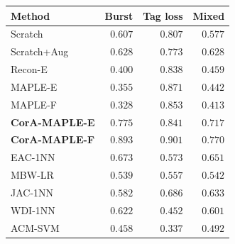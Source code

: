 \begin{tabular}{@{}lrrr@{}}
\toprule
Method & Burst & Tag loss & Mixed \\
\midrule
Scratch & $0.607$ & $0.807$ & $0.577$ \\
Scratch+Aug & $0.628$ & $0.773$ & $0.628$ \\
Recon-E & $0.400$ & $0.838$ & $0.459$ \\
MAPLE-E & $0.355$ & $0.871$ & $0.442$ \\
MAPLE-F & $0.328$ & $0.853$ & $0.413$ \\
\textbf{CorA-MAPLE-E} & $0.775$ & $0.841$ & $0.717$ \\
\textbf{CorA-MAPLE-F} & $\boldsymbol{0.893}$ & $\boldsymbol{0.901}$ & $\boldsymbol{0.770}$ \\
EAC-1NN & $0.673$ & $0.573$ & $0.651$ \\
MBW-LR & $0.539$ & $0.557$ & $0.542$ \\
JAC-1NN & $0.582$ & $0.686$ & $0.633$ \\
WDI-1NN & $0.622$ & $0.452$ & $0.601$ \\
ACM-SVM & $0.458$ & $0.337$ & $0.492$ \\
\bottomrule
\end{tabular}
